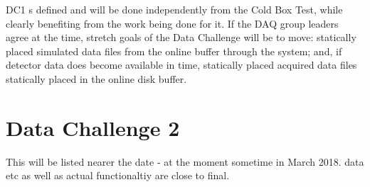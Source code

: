 \documentclass[pdftex,12pt,letter]{article}
\newcommand{\pd}{protoDUNE\xspace}
\begin{document}
DC1 s  defined and will be done independently from the Cold Box Test, while clearly  benefiting from the work being done for it. If the DAQ group leaders agree at the time,  stretch goals of the Data Challenge will be to move: statically placed simulated data files from the online buffer through the system; and, if detector data does become available in time, statically placed acquired data files statically placed in the online disk buffer.

\clearpage

\section{Data Challenge 2}
This will be listed nearer the date - at the moment sometime in March 2018.
data etc as well as actual functionaltiy are close to final.
\end{document}
